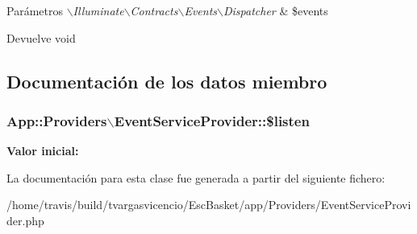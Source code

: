 \begin{DoxyParams}{\-Parámetros}
{\em $\backslash$\-Illuminate$\backslash$\-Contracts$\backslash$\-Events$\backslash$\-Dispatcher} & \$events \\
\hline
\end{DoxyParams}
\begin{DoxyReturn}{\-Devuelve}
void 
\end{DoxyReturn}


\subsection{\-Documentación de los datos miembro}
\hypertarget{class_app_1_1_providers_1_1_event_service_provider_a4f1e1d2be6e48334d5be61a87321f0ee}{
\subsubsection[{\$listen}]{\setlength{\rightskip}{0pt plus 5cm}\-App\-::\-Providers$\backslash$\-Event\-Service\-Provider\-::\$listen}}\label{class_app_1_1_providers_1_1_event_service_provider_a4f1e1d2be6e48334d5be61a87321f0ee}
{\bfseries \-Valor inicial\-:}
\begin{DoxyCode}
 [
        'App\Events\SomeEvent' => [
            'App\Listeners\EventListener',
        ]
\end{DoxyCode}


\-La documentación para esta clase fue generada a partir del siguiente fichero\-:\begin{DoxyCompactItemize}
\item 
/home/travis/build/tvargasvicencio/\-Esc\-Basket/app/\-Providers/\-Event\-Service\-Provider.\-php\end{DoxyCompactItemize}
